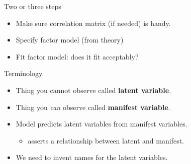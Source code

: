 \documentclass[
  ignorenonframetext,
]{beamer}
\providecommand{\tightlist}{%
  \setlength{\itemsep}{0pt}\setlength{\parskip}{0pt}}
\begin{document}
\begin{frame}{Two or three steps}
\protect\hypertarget{two-or-three-steps}{}

\begin{itemize}
\item
  Make sure correlation matrix (if needed) is handy.
\item
  Specify factor model (from theory)
\item
  Fit factor model: does it fit acceptably?
\end{itemize}

\end{frame}

\begin{frame}{Terminology}
\protect\hypertarget{terminology}{}

\begin{itemize}
\item
  Thing you cannot observe called \textbf{latent variable}.
\item
  Thing you \emph{can} observe called \textbf{manifest variable}.
\item
  Model predicts latent variables from manifest variables.

  \begin{itemize}
  \tightlist
  \item
    asserts a relationship between latent and manifest.
  \end{itemize}
\item
  We need to invent names for the latent variables.
\end{itemize}

\end{frame}
\end{document}
